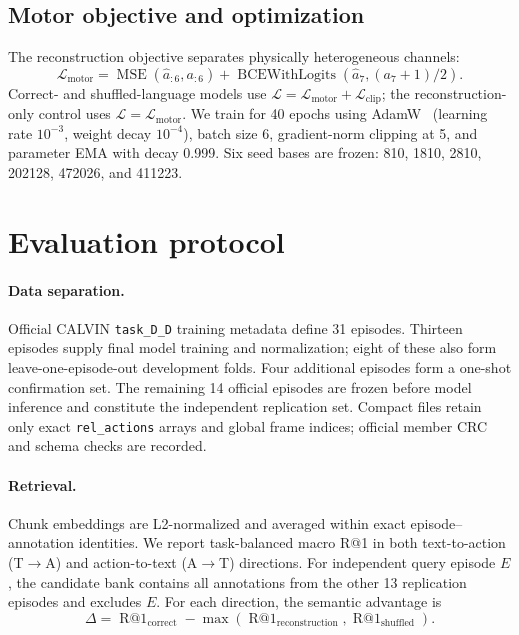 \documentclass{article}
\makeatletter
\newcommand{\mse}{\operatorname{MSE}}
\newcommand{\rone}{\operatorname{R@1}}
\makeatother
\begin{document}
\subsection{Motor objective and optimization}

The reconstruction objective separates physically heterogeneous channels:
\begin{equation}
  \mathcal L_{\mathrm{motor}}
  =\mse(\widehat a_{:6},a_{:6})
  +\operatorname{BCEWithLogits}(\widehat a_7,(a_7+1)/2).
\end{equation}
Correct- and shuffled-language models use
$\mathcal L=\mathcal L_{\mathrm{motor}}+\mathcal L_{\mathrm{clip}}$; the
reconstruction-only control uses $\mathcal L=\mathcal L_{\mathrm{motor}}$.
We train for 40 epochs using AdamW~\citep{adamw} (learning rate $10^{-3}$, weight decay
$10^{-4}$), batch size 6, gradient-norm clipping at 5, and parameter EMA with
decay 0.999.  Six seed bases are frozen:
810, 1810, 2810, 202128, 472026, and 411223.

\section{Evaluation protocol}
\label{sec:protocol}

\paragraph{Data separation.}
Official CALVIN \texttt{task\_D\_D} training metadata define 31 episodes.
Thirteen episodes supply final model training and normalization; eight of
these also form leave-one-episode-out development folds.  Four additional
episodes form a one-shot confirmation set.  The remaining 14 official episodes
are frozen before model inference and constitute the independent replication
set.  Compact files retain only exact \texttt{rel\_actions} arrays and global
frame indices; official member CRC and schema checks are recorded.

\paragraph{Retrieval.}
Chunk embeddings are L2-normalized and averaged within exact
episode--annotation identities.  We report task-balanced macro R@1 in both
text-to-action (T$\rightarrow$A) and action-to-text (A$\rightarrow$T)
directions.  For independent query episode $E$, the candidate bank contains
all annotations from the other 13 replication episodes and excludes $E$.
For each direction, the semantic advantage is
\begin{equation}
 \Delta=\rone_{\mathrm{correct}}-
 \max(\rone_{\mathrm{reconstruction}},\rone_{\mathrm{shuffled}}).
\end{equation}
\end{document}
